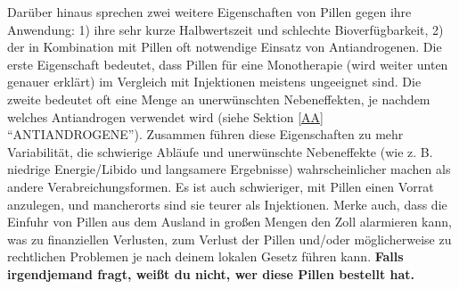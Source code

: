 \documentclass{article}
\begin{document}
Darüber hinaus sprechen zwei weitere Eigenschaften von Pillen gegen ihre Anwendung: 1) ihre sehr kurze Halbwertszeit und schlechte Bioverfügbarkeit, 2) der in Kombination mit Pillen oft notwendige Einsatz von Antiandrogenen. Die erste Eigenschaft bedeutet, dass Pillen für eine Monotherapie (wird weiter unten genauer erklärt) im Vergleich mit Injektionen meistens ungeeignet sind. Die zweite bedeutet oft eine Menge an unerwünschten Nebeneffekten, je nachdem welches Antiandrogen verwendet wird (siehe Sektion \ref{AA} “ANTIANDROGENE”). Zusammen führen diese Eigenschaften zu mehr Variabilität, die schwierige Abläufe und unerwünschte Nebeneffekte  (wie z. B. niedrige Energie/Libido und langsamere Ergebnisse) wahrscheinlicher machen als andere Verabreichungsformen. Es ist auch schwieriger, mit Pillen einen Vorrat anzulegen, und mancherorts sind sie teurer als Injektionen. Merke auch, dass die Einfuhr von Pillen aus dem Ausland in großen Mengen den Zoll alarmieren kann, was zu finanziellen Verlusten, zum Verlust der Pillen und/oder möglicherweise zu rechtlichen Problemen je nach deinem lokalen Gesetz führen kann. \textbf{Falls irgendjemand fragt, weißt du nicht, wer diese Pillen bestellt hat.}
\end{document}
